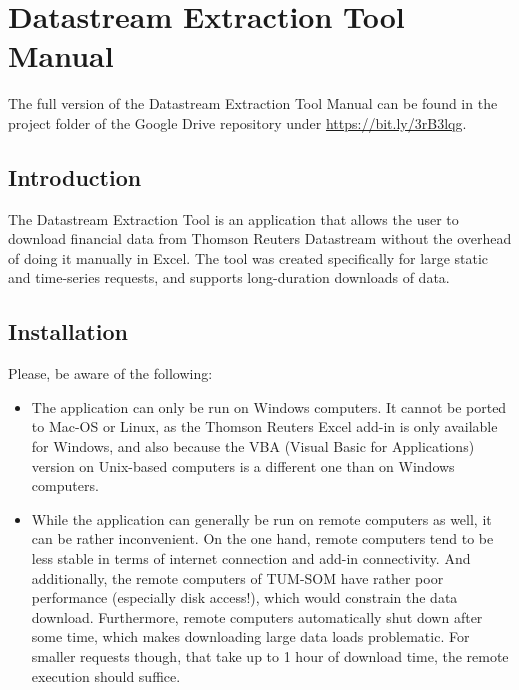 \chapter{Datastream Extraction Tool Manual} \label{appendix-dset-manual}

The full version of the Datastream Extraction Tool Manual can be found in the project folder of the Google Drive repository under \url{https://bit.ly/3rB3lqg}. 

\section{Introduction}
The Datastream Extraction Tool is an application that allows the user to download financial data from Thomson Reuters Datastream without the overhead of doing it manually in Excel. The tool was created specifically for large static and time-series requests, and supports long-duration downloads of data. 

\section{Installation}
Please, be aware of the following: 
\begin{itemize}
	\item The application can only be run on Windows computers. It cannot be ported to Mac-OS or Linux, as the Thomson Reuters Excel add-in is only available for Windows, and also because the VBA (Visual Basic for Applications) version on Unix-based computers is a different one than on Windows computers. 
	\item While the application can generally be run on remote computers as well, it can be rather inconvenient. On the one hand, remote computers tend to be less stable in terms of internet connection and add-in connectivity. And additionally, the remote computers of TUM-SOM have rather poor performance (especially disk access!), which would constrain the data download. Furthermore, remote computers automatically shut down after some time, which makes downloading large data loads problematic. For smaller requests though, that take up to 1 hour of download time, the remote execution should suffice. 
\end{itemize}

